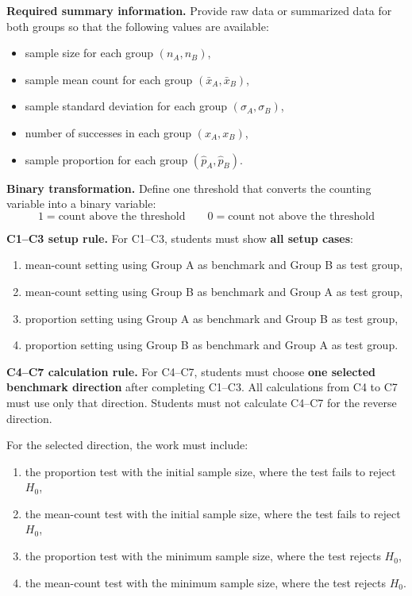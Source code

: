 \documentclass[12pt]{article}
\begin{document}
\textbf{Required summary information.} Provide raw data or summarized data for both groups so that the following values are available:
\begin{itemize}
	\item sample size for each group \((n_A,n_B)\),
	\item sample mean count for each group \((\bar{x}_A,\bar{x}_B)\),
	\item sample standard deviation for each group \((\sigma_A,\sigma_B)\),
	\item number of successes in each group \((x_A,x_B)\),
	\item sample proportion for each group \((\hat p_A,\hat p_B)\).
\end{itemize}

\textbf{Binary transformation.} Define one threshold that converts the counting variable into a binary variable:
\[
1=\text{count above the threshold}
\qquad
0=\text{count not above the threshold}
\]

\textbf{C1--C3 setup rule.} For C1--C3, students must show \textbf{all setup cases}:
\begin{enumerate}
	\item mean-count setting using Group A as benchmark and Group B as test group,
	\item mean-count setting using Group B as benchmark and Group A as test group,
	\item proportion setting using Group A as benchmark and Group B as test group,
	\item proportion setting using Group B as benchmark and Group A as test group.
\end{enumerate}

\textbf{C4--C7 calculation rule.} For C4--C7, students must choose \textbf{one selected benchmark direction} after completing C1--C3. All calculations from C4 to C7 must use only that direction. Students must not calculate C4--C7 for the reverse direction.

For the selected direction, the work must include:
\begin{enumerate}
	\item the proportion test with the initial sample size, where the test fails to reject \(H_0\),
	\item the mean-count test with the initial sample size, where the test fails to reject \(H_0\),
	\item the proportion test with the minimum sample size, where the test rejects \(H_0\),
	\item the mean-count test with the minimum sample size, where the test rejects \(H_0\).
\end{enumerate}
\end{document}

